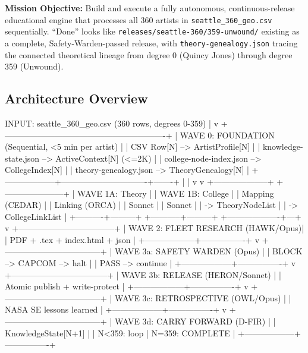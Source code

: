 \documentclass[11pt,letterpaper]{article}
\newcommand{\metafield}[2]{\textbf{\sffamily\textcolor{primary}{#1}} \textcolor{darktext}{#2}\par}
\begin{document}
\metafield{Mission Objective:}{Build and execute a fully autonomous, continuous-release educational
engine that processes all 360 artists in \texttt{seattle\_360\_geo.csv} sequentially. ``Done'' looks
like \texttt{releases/seattle-360/359-unwound/} existing as a complete, Safety-Warden-passed release,
with \texttt{theory-genealogy.json} tracing the connected theoretical lineage from degree 0
(Quincy Jones) through degree 359 (Unwound).}

\subsection{Architecture Overview}

\begin{asciibox}
INPUT: seattle_360_geo.csv (360 rows, degrees 0-359)
                |
                v
+----------------------------------------------------------+
| WAVE 0: FOUNDATION (Sequential, <5 min per artist)       |
|   CSV Row[N] --> ArtistProfile[N]                        |
|   knowledge-state.json --> ActiveContext[N] (<=2K)       |
|   college-node-index.json --> CollegeIndex[N]            |
|   theory-genealogy.json --> TheoryGenealogy[N]           |
+------------------+-------------------------------+-------+
                   |                               |
                   v                               v
+--------------------+              +---------------------+
| WAVE 1A: Theory    |              | WAVE 1B: College    |
| Mapping (CEDAR)    |              | Linking (ORCA)      |
| Sonnet             |              | Sonnet              |
| -> TheoryNodeList  |              | -> CollegeLinkList  |
+----------+---------+              +-----------+---------+
           +-------------------+---+
                               v
           +-----------------------------------+
           | WAVE 2: FLEET RESEARCH (HAWK/Opus)|
           |   PDF + .tex + index.html + json  |
           +------------------+----------------+
                              v
           +-----------------------------------+
           | WAVE 3a: SAFETY WARDEN (Opus)     |
           |   BLOCK --> CAPCOM --> halt        |
           |   PASS  --> continue              |
           +------------------+----------------+
                              v
           +-----------------------------------+
           | WAVE 3b: RELEASE (HERON/Sonnet)   |
           |   Atomic publish + write-protect  |
           +------------------+----------------+
                              v
           +-----------------------------------+
           | WAVE 3c: RETROSPECTIVE (OWL/Opus) |
           |   NASA SE lessons learned         |
           +------------------+----------------+
                              v
           +-----------------------------------+
           | WAVE 3d: CARRY FORWARD (D-FIR)    |
           |   KnowledgeState[N+1]             |
           |   N<359: loop  |  N=359: COMPLETE |
           +------------------+----------------+
\end{asciibox}
\end{document}
